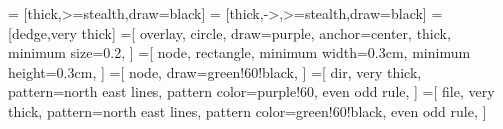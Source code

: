 \newcommand{\weight}[1]{node[midway,sloped,above] {\scalebox{0.7}{\textsl{\textcolor{purple}{#1}}}}}
  = [thick,>=stealth,draw=black]
 = [thick,->,>=stealth,draw=black]
 = [dedge,very thick]
=[
  overlay,
  circle,
  draw=purple,
  anchor=center,
  thick,
  minimum size=0.2,
]
=[
  node,
  rectangle,
  minimum width=0.3cm,
  minimum height=0.3cm,
]
=[
  node,
  draw=green!60!black,
]
=[
  dir,
  very thick,
  pattern=north east lines,
  pattern color=purple!60,
  even odd rule,
]
=[
  file,
  very thick,
  pattern=north east lines,
  pattern color=green!60!black,
  even odd rule,
]

\IgnoreSpacesOn
\prgNewFunction {} {
}
\IgnoreSpacesOff

